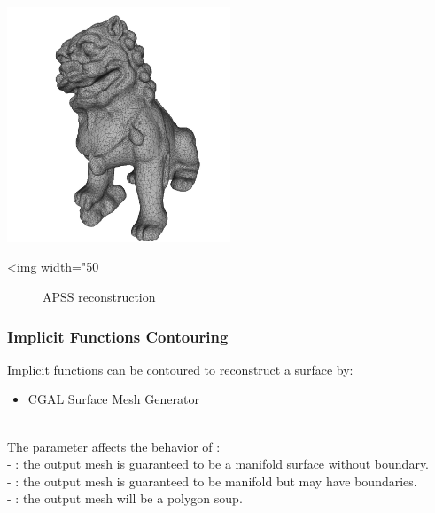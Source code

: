 \begin{center}
    \label{Surface_reconstruction_3-fig-APSS}
    \begin{ccTexOnly}
        \includegraphics[width=0.5\textwidth]{Surface_reconstruction_3/APSS} %
    \end{ccTexOnly}
    \begin{ccHtmlOnly}
        <img width="50%
    \end{ccHtmlOnly}
    \begin{figure}[h]
        \caption{APSS reconstruction}
    \end{figure}
\end{center}


\subsubsection{Implicit Functions Contouring}

Implicit functions can be contoured to reconstruct a surface by:

\begin{itemize}
\item CGAL Surface Mesh Generator~\cite{cgal:ry-gsddrm-06,cgal:bo-pgsms-05}
\end{itemize}

  \\

The parameter  affects the behavior of : \\
- : the output mesh is guaranteed to be a manifold
surface without boundary.\\
- : the output mesh is guaranteed to be
manifold but may have boundaries.\\
- : the output mesh will be a polygon soup.

